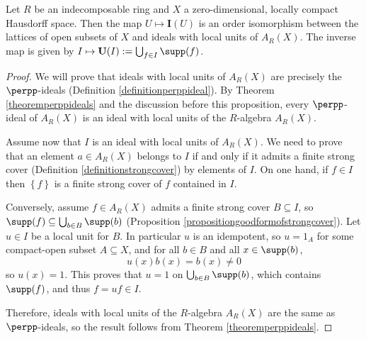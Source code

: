 \begin{proposition}\label{prop:ideals}
Let $R$ be an indecomposable ring and $X$ a zero-dimensional, locally compact Hausdorff space. Then the map $U\mapsto \mathbf{I}(U)$ is an order isomorphism between the lattices of open subsets of $X$ and ideals with local units of $A_R(X)$. The inverse map is given by $I\mapsto \mathbf{U}(I):=\bigcup_{f\in I}\supp(f)$.
\end{proposition} 
\begin{proof}
We will prove that ideals with local units of $A_R(X)$ are precisely the $\perpp$-ideals (Definition \ref{definitionperppideal}). By Theorem \ref{theoremperppideals} and the discussion before this proposition, every $\perpp$-ideal of $A_R(X)$ is an ideal with local units of the $R$-algebra $A_R(X)$.%

Assume now that $I$ is an ideal with local units of $A_R(X)$. We need to prove that an element $a\in A_R(X)$ belongs to $I$ if and only if it admits a finite strong cover (Definition \ref{definitionstrongcover}) by elements of $I$. On one hand, if $f\in I$ then $\left\{f\right\}$ is a finite strong cover of $f$ contained in $I$.%

Conversely, assume $f\in A_R(X)$ admits a finite strong cover $B\subseteq I$, so $\supp(f)\subseteq\bigcup_{b\in B}\supp(b)$ (Proposition \ref{propositiongoodformofstrongcover}). Let $u\in I$ be a local unit for $B$. In particular $u$ is an idempotent, so $u=1_A$ for some compact-open subset $A\subseteq X$, and for all $b\in B$ and all $x\in\supp(b)$,
\[u(x)b(x)=b(x)\neq 0\]
so $u(x)=1$. This proves that $u=1$ on $\bigcup_{b\in B}\supp(b)$, which contains $\supp(f)$, and thus $f=uf\in I$.

Therefore, ideals with local units of the $R$-algebra $A_R(X)$ are the same as $\perpp$-ideals, so the result follows from Theorem \ref{theoremperppideals}.\qedhere
\end{proof}


